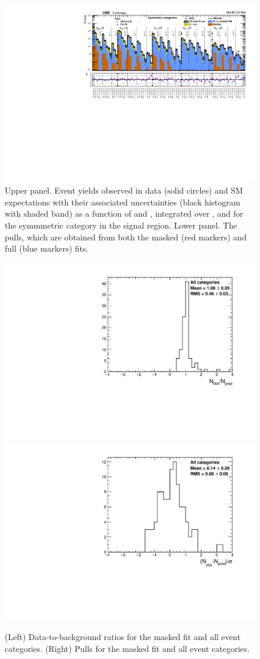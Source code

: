\clearpage
\begin{figure}[h!]
  \centering
  \caption{Upper panel. Event yields observed in data (solid circles)
    and SM expectations with their associated uncertainties (black
    histogram with shaded band) as a function of \nb and \scalht,
    integrated over \mht, and for the symmmetric \njet category
    in the signal region. Lower panel. The pulls, which are obtained
    from both the masked (red markers) and full (blue markers) fits. }
  \label{fig:mr_symm_pulls}
  \includegraphics[width=1.\linewidth]{figures/results/36invfb/symm/summaryPlot_Symmetric_prefit_overlay_fit_b}
\end{figure}


\clearpage
\begin{figure}[h!]
  \centering
  \caption{(Left) Data-to-background ratios for the masked fit and all
    event categories. (Right) Pulls for the masked fit and all
    event categories.}
  \label{fig:ratios_and_pulls}
  \includegraphics[width=0.49\linewidth]{figures/results/36invfb/all/ratios_all_prefit.pdf}
  \includegraphics[width=0.49\linewidth]{figures/results/36invfb/all/pulls_all_prefit.pdf}
\end{figure}

